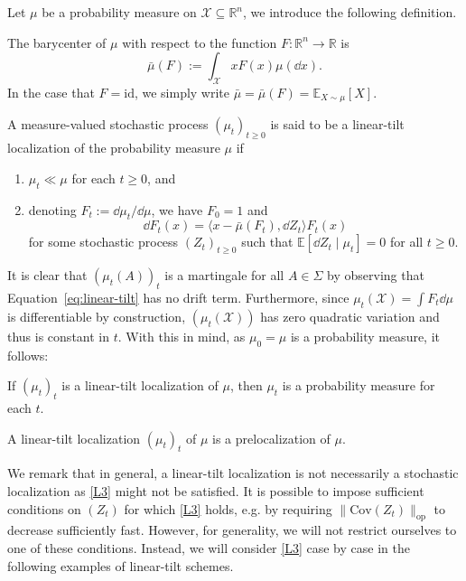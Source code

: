 Let \(\mu\) be a probability measure on \(\mathcal{X} \subseteq \mathbb{R}^n\), we introduce the following definition.
\begin{definition}[Barycenter]
  The barycenter of \(\mu\) with respect to the function \(F : \mathbb{R}^n \to \mathbb{R}\) is
  \[\bar{\mu}(F) := \int_{\mathcal{X}} x F(x) \mu(\dd x).\]
  In the case that \(F = \text{id}\), we simply write \(\bar{\mu} = \bar{\mu}(F) = \mathbb{E}_{X \sim \mu}[X]\).
\end{definition}

\begin{definition}
  A measure-valued stochastic process \((\mu_t)_{t \ge 0}\) is said to be a linear-tilt localization of
  the probability measure \(\mu\) if 
  \begin{enumerate}
    \item \(\mu_t \ll \mu\) for each \(t \ge 0\), and 
    \item denoting \(F_t := \dd \mu_t / \dd \mu\), we have \(F_0 = 1\) and 
      \begin{equation}\label{eq:linear-tilt}
        \dd F_t(x) = \langle x - \bar{\mu}(F_t), \dd Z_t \rangle F_t(x)
      \end{equation}
      for some stochastic process \((Z_t)_{t \ge 0}\) such that \(\mathbb{E}[\dd Z_t \mid \mu_t] = 0\) 
      for all \(t \ge 0\). 
  \end{enumerate} 
\end{definition}

It is clear that \((\mu_t(A))_t\) is a martingale for all \(A \in \Sigma\) by observing that 
Equation~\eqref{eq:linear-tilt} has no drift term. Furthermore, since \(\mu_t(\mathcal{X}) = \int F_t \dd \mu\) is differentiable by 
construction, \((\mu_t(\mathcal{X}))\) has zero quadratic variation and thus is constant in \(t\). 
With this in mind, as \(\mu_0 = \mu\) is a probability measure, it follows:

\begin{proposition}
  If \((\mu_t)_t\) is a linear-tilt localization of \(\mu\), then \(\mu_t\) is a probability measure for each \(t\).
\end{proposition}

\begin{corollary}
  A linear-tilt localization \((\mu_t)_t\) of \(\mu\) is a prelocalization of \(\mu\).
\end{corollary}

We remark that in general, a linear-tilt localization is not necessarily a stochastic localization as \eqref{L3} 
might not be satisfied. It is possible to impose sufficient conditions on \((Z_t)\) for which \eqref{L3} holds,
e.g. by requiring \(\|\text{Cov}(Z_t)\|_{\text{op}}\) to decrease sufficiently fast. However, for generality, 
we will not restrict ourselves to one of these conditions. Instead, we will consider \eqref{L3} case by case 
in the following examples of linear-tilt schemes. 

